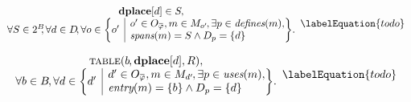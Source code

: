 

\begin{equation}
  \begin{array}{c}
    \mVar{dplace}[d] \in S \hspace{-.8pt}, \\
    \forall S \in \mPowerset{\mBlockSet} \!\!,
    \forall d \in \mDataSet \!,
    \forall o \in
      \mSetBuilder*{o'}%
                   {%
                     \begin{array}{@{}l@{}}
                       o' \in \mOpCompSet{\mPhi},
                       m \in \mMatchSet[o'] \hspace{-1pt},
                       \exists p \in \mDefines(m), \\
                       \mSpans(m) = S \mAnd \mDataSet[p] = \mSet{d}
                     \end{array}
                   } \!.
  \end{array}
  \labelEquation{todo}
\end{equation}



\begin{equation}
  \begin{array}{c}
    \mTable(b \hspace{-.8pt}, \mVar{dplace}[d], \mDomMatrix), \\
    \forall b \in \mBlockSet \hspace{-1pt},
    \forall d \in
      \mSetBuilder*{d'}%
                   {%
                     \begin{array}{@{}l@{}}
                       d' \in \mOpCompSet{\mPhi},
                       m \in \mMatchSet[d'] \hspace{-1pt},
                       \exists p \in \mUses(m), \\
                       \mEntry(m) = \mSet{b}
                       \mAnd \mDataSet[p] = \mSet{d}
                     \end{array}
                   } \!.
  \end{array}
  \labelEquation{todo}
\end{equation}

